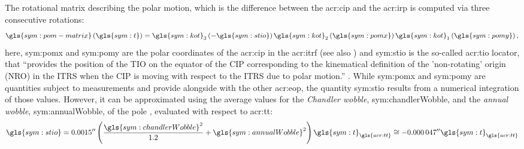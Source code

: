 The rotational matrix describing the polar motion, which is the difference between the \gls{acr:cip} and the \gls{acr:irp} is computed via three consecutive rotations:
\begin{equation}
\gls{sym:pom-matrix}\left(\gls{sym:t}\right) = \gls{sym:kot}_{3}\left(-\gls{sym:stio}\right) \gls{sym:kot}_{2}\left(\gls{sym:pomx}\right) \gls{sym:kot}_{1}\left(\gls{sym:pomy}\right), 
\label{eq:PM}
\end{equation}
here, \gls{sym:pomx} and \gls{sym:pomy} are the polar coordinates of the \gls{acr:cip} in the \gls{acr:itrf} (see also ) and \gls{sym:stio} is the so-called \gls{acr:tio} locator, that ``provides the position of the TIO on the equator of the CIP corresponding to the kinematical definition of the 'non-rotating' origin (NRO) in the ITRS when the CIP 
is moving with respect to the ITRS due to polar motion.'' \citep{luzum2010}. While \gls{sym:pomx} and \gls{sym:pomy} are quantities subject to measurements and provide alongside with the other \gls{acr:eop}, the 
quantity \gls{sym:stio} results from a numerical integration of those values. However, it can be approximated using the average values for the \textit{Chandler wobble}, \gls{sym:chandlerWobble}, and the \textit{annual wobble}, \gls{sym:annualWobble}, of the pole \citep{vallado2013}, evaluated with respect 
to \gls{acr:tt}:
\begin{equation}
 \gls{sym:stio} = \ang{;;0.0015}\left(\frac{\gls{sym:chandlerWobble}^2}{\num{1.2}} + \gls{sym:annualWobble}^2\right)\gls{sym:t}_{\gls{acr:tt}} \cong -\ang{;;0.000047}\gls{sym:t}_{\gls{acr:tt}}
\end{equation}

